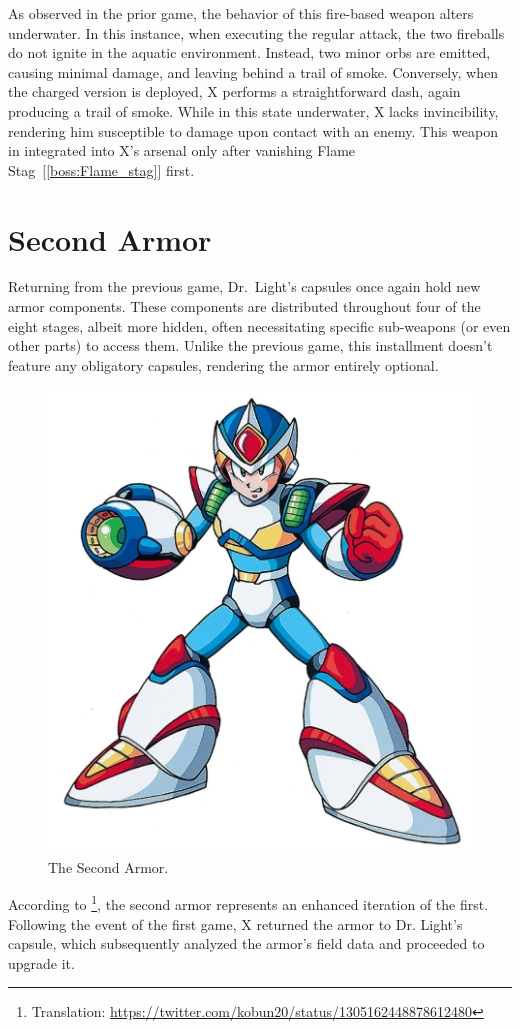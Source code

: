 As observed in the prior game, the behavior of this fire-based weapon alters underwater. In this instance, when executing the regular attack, the two fireballs do not ignite in the aquatic environment. Instead, two minor orbs are emitted, causing minimal damage, and leaving behind a trail of smoke. Conversely, when the charged version is deployed, X performs a straightforward dash, again producing a trail of smoke. While in this state underwater, X lacks invincibility, rendering him susceptible to damage upon contact with an enemy. This weapon in integrated into X's arsenal only after vanishing Flame Stag~[\ref{boss:Flame_stag}] first.

\section{Second Armor}\label{X2:Armor}
Returning from the previous game, Dr.~Light's capsules once again hold new armor components. These components are distributed throughout four of the eight stages, albeit more hidden, often necessitating specific sub-weapons (or even other parts) to access them. Unlike the previous game, this installment doesn't feature any obligatory capsules, rendering the armor entirely optional.
\begin{figure}[htp]
	\centering
	\includegraphics[height=\portraitsize]{figures/X2/X2armor.png}
	\caption{The Second Armor.}
\end{figure}
According to \cite{tw:second_armor}\footnote{Translation: \url{https://twitter.com/kobun20/status/1305162448878612480}}, the second armor represents an enhanced iteration of the first. Following the event of the first game, X returned the armor to Dr. Light's capsule, which subsequently analyzed the armor's field data and proceeded to upgrade it.

